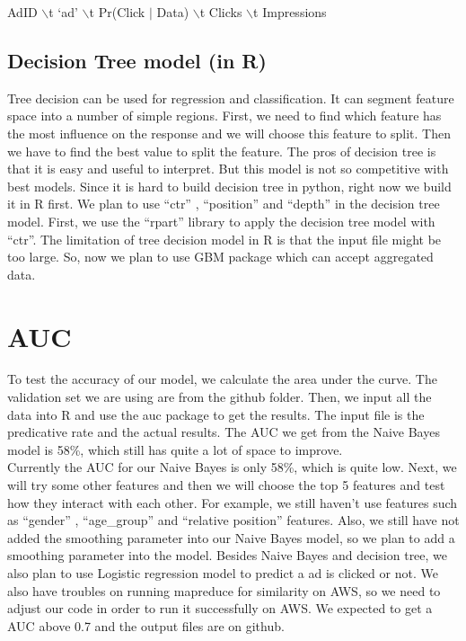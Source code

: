 \documentclass[12pt]{article}
\begin{document}
AdID  $\backslash$t `ad' $\backslash$t Pr(Click $\mid$ Data) $\backslash$t Clicks $\backslash$t Impressions\\




\subsection{Decision Tree model (in R)}

Tree decision can be used for regression and classification. It can segment feature space into a number of simple regions. First, we need to find which feature has the most influence on the response and we will choose this feature to split. Then we have to find the best value to split the feature. The pros of decision tree is that it is easy and useful to interpret. But this model is not so competitive with best models. Since it is hard to build decision tree in python, right now we build it in R first.  
We plan to use ``ctr'' , ``position'' and ``depth'' in the decision tree model. First, we use the ``rpart'' library to apply the decision tree model with ``ctr''. The limitation of tree decision model in R is that the input file might be too large. So, now we plan to use GBM package which can accept aggregated data. \\



\section{AUC}
To test the accuracy of our model, we calculate the area under the curve. The validation set we are using are from the github folder. Then, we input all the data into R and use the auc package to get the results. The input file is the predicative rate and the actual results. The AUC we get from the Naive Bayes model is 58\%, which still has quite a lot of space to improve.\\

Currently the AUC for our Naive Bayes is only 58\%, which is quite low. Next, we will try some other features and then we will choose the top 5 features and test how they interact with each other. For example, we still haven't use features such as ``gender'' , ``age\_group'' and ``relative position'' features. Also, we still have not added the smoothing parameter into our Naive Bayes model, so we plan to add a smoothing parameter into the model. Besides Naive Bayes and decision tree, we also plan to use Logistic regression model to predict a ad is clicked or not. We also have troubles on running mapreduce for similarity on AWS, so we need to adjust our code in order to run it successfully on AWS. We expected to get a AUC above 0.7 and the output files are on github.\\
\end{document}
